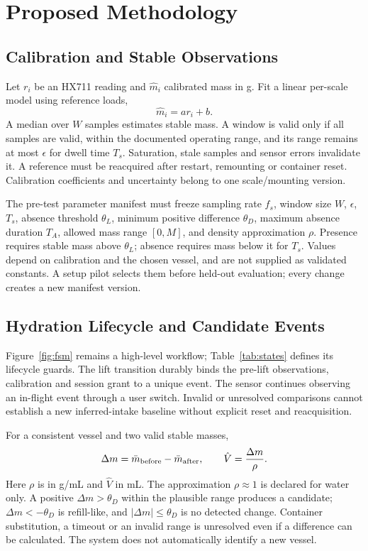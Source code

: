 \section{Proposed Methodology}\label{sec:method}
\subsection{Calibration and Stable Observations}
Let $r_i$ be an HX711 reading and $\hat m_i$ calibrated mass in g. Fit a linear per-scale model using reference loads,
\begin{equation}\hat m_i=a r_i+b.\label{eq:calibration}\end{equation}
A median over $W$ samples estimates stable mass. A window is valid only if all samples are valid, within the documented operating range, and its range remains at most $\epsilon$ for dwell time $T_s$. Saturation, stale samples and sensor errors invalidate it. A reference must be reacquired after restart, remounting or container reset. Calibration coefficients and uncertainty belong to one scale/mounting version.

The pre-test parameter manifest must freeze sampling rate $f_s$, window size $W$, $\epsilon$, $T_s$, absence threshold $\theta_L$, minimum positive difference $\theta_D$, maximum absence duration $T_A$, allowed mass range $[0,M]$, and density approximation $\rho$. Presence requires stable mass above $\theta_L$; absence requires mass below it for $T_s$. Values depend on calibration and the chosen vessel, and are not supplied as validated constants. A setup pilot selects them before held-out evaluation; every change creates a new manifest version.

\subsection{Hydration Lifecycle and Candidate Events}
Figure~\ref{fig:fsm} remains a high-level workflow; Table~\ref{tab:states} defines its lifecycle guards. The lift transition durably binds the pre-lift observations, calibration and session grant to a unique event. The sensor continues observing an in-flight event through a user switch. Invalid or unresolved comparisons cannot establish a new inferred-intake baseline without explicit reset and reacquisition.



For a consistent vessel and two valid stable masses,
\begin{equation}\Delta m=\bar m_{\rm before}-\bar m_{\rm after},\qquad
\hat V=\frac{\Delta m}{\rho}.\label{eq:volume}\end{equation}
Here $\rho$ is in g/mL and $\hat V$ in mL. The approximation $\rho\approx1$ is declared for water only. A positive $\Delta m>\theta_D$ within the plausible range produces a candidate; $\Delta m<-\theta_D$ is refill-like, and $|\Delta m|\leq\theta_D$ is no detected change. Container substitution, a timeout or an invalid range is unresolved even if a difference can be calculated. The system does not automatically identify a new vessel.

